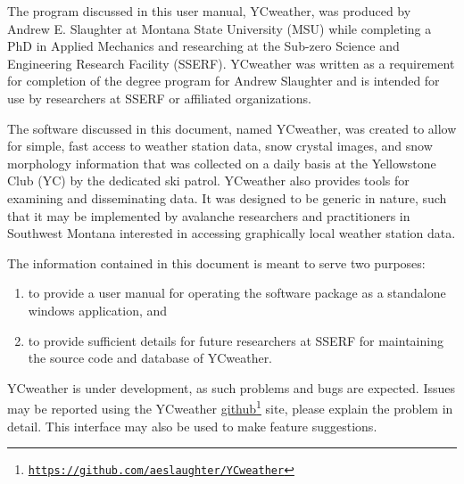 The program discussed in this user manual, YCweather, was produced by Andrew E. Slaughter at Montana State University (MSU) while completing a PhD in Applied Mechanics and researching at the Sub-zero Science and Engineering Research Facility (SSERF). YCweather was written as a requirement for completion of the degree program for Andrew Slaughter and is intended for use by researchers at SSERF or affiliated organizations.

The software discussed in this document, named YCweather, was created to allow for simple, fast access to weather station data, snow crystal images, and snow morphology information that was collected on a daily basis at the Yellowstone Club (YC) by the dedicated ski patrol.  YCweather also provides tools for examining and disseminating data.  It was designed to be generic in nature, such that it may be implemented by avalanche researchers and practitioners in Southwest Montana interested in accessing graphically local weather station data.  

The information contained in this document is meant to serve two purposes:
\begin{enumerate}
\item to provide a user manual for operating the software package as a standalone windows application, and
\item to provide sufficient details for future researchers at SSERF for maintaining the source code and database of YCweather.
\end{enumerate}

YCweather is under development, as such problems and bugs are expected. Issues may be reported using the YCweather \href{https://github.com/aeslaughter/YCweather}{github}\footnote{\href{https://github.com/aeslaughter/YCweather}{\nolinkurl{https://github.com/aeslaughter/YCweather}}} site, please explain the problem in detail. This interface may also be used to make feature suggestions.